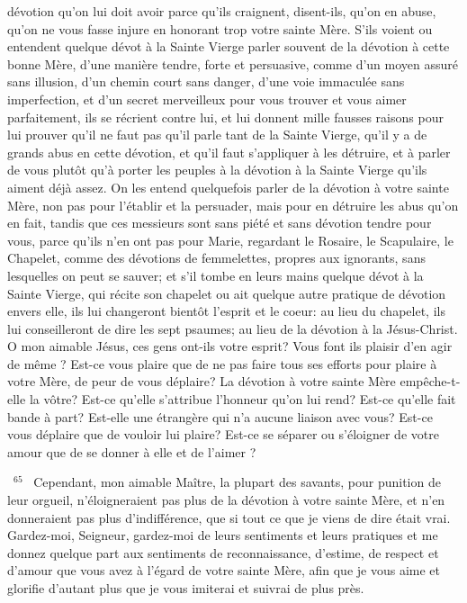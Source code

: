 \documentclass[paper=a5,pagesize=pdftex,fontsize=15pt,headinclude=on,twoside=off]{scrbook}
\newcommand{\negphantom}[1]{\settowidth{\dimen0}{#1}\hspace*{-\dimen0}}
\newcommand{\versenb}[1]{\par \vspace{10pt}~\negphantom{~${}^{#1}$~}${}^{#1}$~}
\begin{document}
dévotion qu'on lui doit avoir parce qu'ils craignent, disent-ils, qu'on en abuse, qu'on ne vous fasse injure en
honorant trop votre sainte Mère. S'ils voient ou entendent quelque dévot à la Sainte Vierge parler souvent de la
dévotion à cette bonne Mère, d'une manière tendre, forte et persuasive, comme d'un moyen assuré sans illusion,
d'un chemin court sans danger, d'une voie immaculée sans imperfection, et d'un secret merveilleux pour vous
trouver et vous aimer parfaitement, ils se récrient contre lui, et lui donnent mille fausses raisons pour lui prouver
qu'il ne faut pas qu'il parle tant de la Sainte Vierge, qu'il y a de grands abus en cette dévotion, et qu'il faut
s'appliquer à les détruire, et à parler de vous plutôt qu'à porter les peuples à la dévotion à la Sainte Vierge qu'ils
aiment déjà assez.
On les entend quelquefois parler de la dévotion à votre sainte Mère, non pas pour l'établir et la persuader, mais
pour en détruire les abus qu'on en fait, tandis que ces messieurs sont sans piété et sans dévotion tendre pour
vous, parce qu'ils n'en ont pas pour Marie, regardant le Rosaire, le Scapulaire, le Chapelet, comme des dévotions
de femmelettes, propres aux ignorants, sans lesquelles on peut se sauver; et s'il tombe en leurs mains quelque
dévot à la Sainte Vierge, qui récite son chapelet ou ait quelque autre pratique de dévotion envers elle, ils lui
changeront bientôt l'esprit et le coeur: au lieu du chapelet, ils lui conseilleront de dire les sept psaumes; au lieu de
la dévotion à la Jésus-Christ.
O mon aimable Jésus, ces gens ont-ils votre esprit? Vous font ils plaisir d'en agir de même ? Est-ce vous plaire
que de ne pas faire tous ses efforts pour plaire à votre Mère, de peur de vous déplaire? La dévotion à votre sainte
Mère empêche-t-elle la vôtre? Est-ce qu'elle s'attribue l'honneur qu'on lui rend? Est-ce qu'elle fait bande à part?
Est-elle une étrangère qui n'a aucune liaison avec vous? Est-ce vous déplaire que de vouloir lui plaire? Est-ce se
séparer ou s'éloigner de votre amour que de se donner à elle et de l'aimer ?
\versenb{65} Cependant, mon aimable Maître, la plupart des savants, pour punition de leur orgueil, n'éloigneraient pas plus
de la dévotion à votre sainte Mère, et n'en donneraient pas plus d'indifférence, que si tout ce que je viens de dire
était vrai. Gardez-moi, Seigneur, gardez-moi de leurs sentiments et leurs pratiques et me donnez quelque part aux
sentiments de reconnaissance, d'estime, de respect et d'amour que vous avez à l'égard de votre sainte Mère, afin
que je vous aime et glorifie d'autant plus que je vous imiterai et suivrai de plus près.
\end{document}
